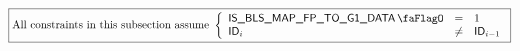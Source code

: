 \[
    \boxed{\text{All constraints in this subsection assume }
        \left\{ \begin{array}{lcl}
            \isBlsMapFpToGOneData  & =    & 1            \\
            \blsId_{i}             & \neq & \blsId_{i-1} \\
        \end{array} \right.
    }
\]